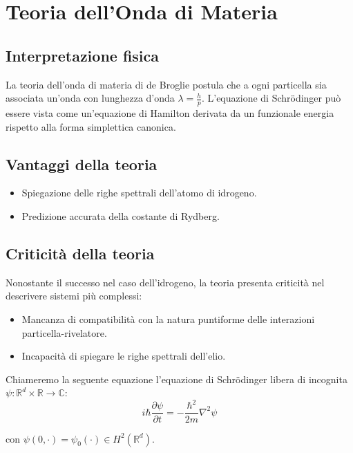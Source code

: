 \section{Teoria dell'Onda di Materia}
\subsection{Interpretazione fisica}
La teoria dell'onda di materia di de Broglie postula che a ogni particella sia associata un'onda con lunghezza d'onda $\lambda = \frac{h}{p}$. L'equazione di Schr\"odinger pu\`o essere vista come un'equazione di Hamilton derivata da un funzionale energia rispetto alla forma simplettica canonica.

\subsection{Vantaggi della teoria}
\begin{itemize}
    \item Spiegazione delle righe spettrali dell'atomo di idrogeno.
    \item Predizione accurata della costante di Rydberg.
\end{itemize}

\subsection{Criticit\`a della teoria}
Nonostante il successo nel caso dell'idrogeno, la teoria presenta criticit\`a nel descrivere sistemi pi\`u complessi:
\begin{itemize}
    \item Mancanza di compatibilit\`a con la natura puntiforme delle interazioni particella-rivelatore.
    \item Incapacit\`a di spiegare le righe spettrali dell'elio.
\end{itemize}


Chiameremo la seguente equazione l'equazione di Schr\"odinger libera di incognita $\psi: \mathbb{R}^d \times \mathbb{R} \to \mathbb{C}$: 
\begin{equation}
     i \hbar \frac{\partial \psi}{\partial t} = -\frac{\hbar^2}{2m} \nabla^2 \psi     
\end{equation}

con $\psi(0, \cdot) = \psi_0(\cdot) \in H^2(\mathbb{R}^d)$.